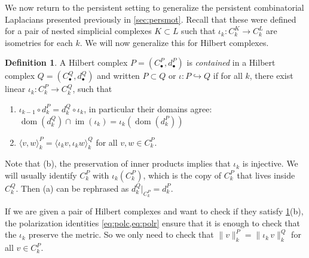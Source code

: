 \documentclass[11pt]{article}
\theoremstyle{definition}
\newtheorem{definition}[theorem]{Definition}
\theoremstyle{remark}
\DeclareMathOperator\dom{dom}
\DeclareMathOperator{\im}{im}
\begin{document}
We now return to the persistent setting to generalize the persistent combinatorial Laplacians presented previously in \cref{sec:persmot}. Recall that these were defined for a pair of nested simplicial complexes $K \subset L$ such that $\iota_k:C_k^K\to C_k^L$ are isometries for each $k$. We will now generalize this for Hilbert complexes.

\begin{definition} \label{def:inclusion}
    A Hilbert complex $P=(C^P_\bullet,d^{P}_{\bullet})$ is \textit{contained} in a Hilbert complex $Q=(C^Q_\bullet,d^{Q}_{\bullet})$ and written $P \subset Q$ or $\iota: P \hookrightarrow Q$ if for all $k$, there exist linear $\iota_k: C^{P}_{k} \rightarrow C^{Q}_{k}$, such that
\begin{enumerate}
    \item[(a)] $\iota_{k-1} \circ d^{P}_k = d^{Q}_k \circ \iota_k$, in particular their domains agree: $\dom(d_k^Q) \cap \im(\iota_k)=\iota_k(\dom(d_k^P))$
    \item[(b)] $\langle v,w \rangle^{P}_k = \langle \iota_k v,\iota_k w\rangle^{Q}_k$ for all $v,w \in C_k^P$. 
\end{enumerate}
\end{definition}
Note that (b), the preservation of inner products implies that $\iota_k$ is injective. We will usually identify $C_k^P$ with $\iota_k(C_k^P)$, which is the copy of $C_k^P$ that lives inside $C_k^Q$. Then (a) can be rephrased as $d^Q_k \lvert_{C^P_k} = d^P_k$.

If we are given a pair of Hilbert complexes and want to check if they satisfy \cref{def:inclusion}(b), the polarization identities \cref{eq:polc,eq:polr}
ensure that it is enough to check that the $\iota_k$ preserve the metric. So we only need to check that $\|v\|_k^P=\|\iota_k \, v\|_k^Q$ for all $v \in C_k^P$.\\
\end{document}
